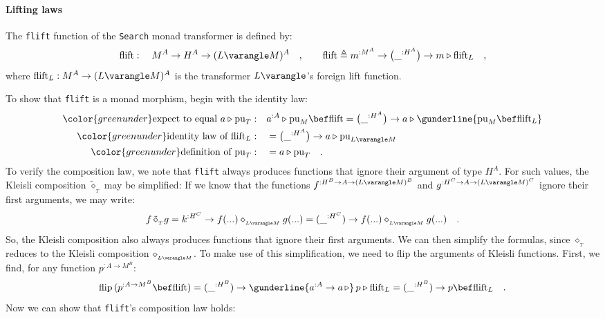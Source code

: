 \paragraph{Lifting laws}

The \lstinline!flift! function of the \lstinline!Search! monad transformer
is defined by:
\[
\text{flift}:\quad M^{A}\rightarrow H^{A}\rightarrow(L\varangle M)^{A}\quad,\quad\quad\text{flift}\triangleq m^{:M^{A}}\rightarrow\big(\_^{:H^{A}}\big)\rightarrow m\triangleright\text{flift}_{L}\quad,
\]
where $\text{flift}_{L}:M^{A}\rightarrow(L\varangle M)^{A}$ is the
transformer $L\varangle$\textsf{'}s foreign lift function.

To show that \lstinline!flift! is a monad morphism, begin with the
identity law:
\begin{align*}
{\color{greenunder}\text{expect to equal }a\triangleright\text{pu}_{T}:}\quad & a^{:A}\triangleright\text{pu}_{M}\bef\text{flift}=\big(\_^{:H^{A}}\big)\rightarrow a\triangleright\gunderline{\text{pu}_{M}\bef\text{flift}_{L}}\\
{\color{greenunder}\text{identity law of }\text{flift}_{L}:}\quad & =\big(\_^{:H^{A}}\big)\rightarrow a\triangleright\text{pu}_{L\varangle M}\\
{\color{greenunder}\text{definition of }\text{pu}_{T}:}\quad & =a\triangleright\text{pu}_{T}\quad.
\end{align*}
To verify the composition law, we note that \lstinline!flift! always
produces functions that ignore their argument of type $H^{A}$. For
such values, the Kleisli composition $\tilde{\diamond}_{_{T}}$ may
be simplified: If we know that the functions $f^{:H^{B}\rightarrow A\rightarrow(L\varangle M)^{B}}$
and $g^{:H^{C}\rightarrow A\rightarrow(L\varangle M)^{C}}$ ignore
their first arguments, we may write:
\[
f\,\tilde{\diamond}_{_{T}}g=k^{:H^{C}}\rightarrow f(...)\diamond_{_{L\varangle M}}g(...)=(\_^{:H^{C}})\rightarrow f(...)\diamond_{_{L\varangle M}}g(...)\quad.
\]
So, the Kleisli composition also always produces functions that ignore
their first arguments. We can then simplify the formulas, since $\diamond_{_{T}}$
reduces to the Kleisli composition $\diamond_{_{L\varangle M}}$.
To make use of this simplification, we need to flip the arguments
of Kleisli functions. First, we find, for any function $p^{:A\rightarrow M^{B}}$:
\[
\text{flip}\,(p^{:A\rightarrow M^{B}}\bef\text{flift})=(\_^{:H^{B}})\rightarrow\gunderline{a^{:A}\rightarrow a\,\triangleright}\,p\triangleright\text{flift}_{L}=(\_^{:H^{B}})\rightarrow p\bef\text{flift}_{L}\quad.
\]
Now we can show that \lstinline!flift!\textsf{'}s composition law holds:
